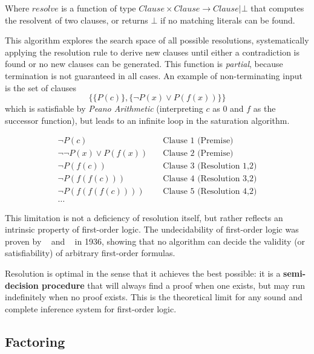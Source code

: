 Where \(resolve\) is a function of type \(Clause \times Clause \to Clause | \bot\) that computes the resolvent of two clauses, or returns \(\bot\) if no matching literals can be found.

This algorithm explores the search space of all possible resolutions, systematically applying the resolution rule to derive new clauses until either a contradiction is found or no new clauses can be generated.
This function is \emph{partial}, because termination is not guaranteed in all cases.
An example of non-terminating input is the set of clauses
\begin{equation}\label{eq:non_terminating}
  \{ \{P(c)\}, \{\neg P(x) \lor P(f(x))\} \}
\end{equation}
which is satisfiable by \textit{Peano Arithmetic} (interpreting \(c\) as \(0\) and \(f\) as the successor function), but leads to an infinite loop in the saturation algorithm.

\begin{equation}
   \begin{aligned}
    \neg P(c) &\quad \text{Clause 1 (Premise)} \\
    \neg \neg P(x) \lor P(f(x)) &\quad \text{Clause 2 (Premise)} \\
    \neg P(f(c)) &\quad \text{Clause 3 (Resolution 1,2)} \\
    \neg P(f(f(c))) &\quad \text{Clause 4 (Resolution 3,2)} \\
    \neg P(f(f(f(c)))) &\quad \text{Clause 5 (Resolution 4,2)}\\
    \ldots
  \end{aligned}
\end{equation}

This limitation is not a deficiency of resolution itself, but rather reflects an intrinsic property of first-order logic. The undecidability of first-order logic was proven by \citeauthor{church1936}~\cite{church1936} and \citeauthor{turing1936}~\cite{turing1936} in 1936, showing that no algorithm can decide the validity (or satisfiability) of arbitrary first-order formulas.

Resolution is optimal in the sense that it achieves the best possible: it is a \textbf{semi-decision procedure} that will always find a proof when one exists, but may run indefinitely when no proof exists. This is the theoretical limit for any sound and complete inference system for first-order logic.

\subsection{Factoring}

